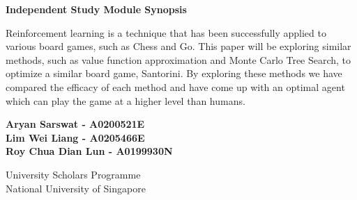 \documentclass[a4paper,12pt,table]{article}
\begin{document}
    
\begin{titlepage}
    \begin{center} 
        \textbf{{\Huge Independent Study Module Synopsis}}
    \vspace{3cm}
    
    \end{center}
  \Large Reinforcement learning is a technique that has been successfully applied to various board games, such as Chess and Go. This paper will be exploring similar methods, such as value function approximation and Monte Carlo Tree Search, to optimize a similar board game, Santorini. By exploring these methods we have compared the efficacy of each method and have come up with an optimal agent which can play the game at a higher level than humans.  \par
 
        \vspace{0.5cm}
 
        \vspace{1.5cm}
 
 
        \vfill
 
 
        \begin{center}
            \textbf{Aryan Sarswat -  A0200521E \\
            Lim Wei Liang - A0205466E \\
            Roy Chua Dian Lun - A0199930N \\ }
    
           \vspace{0.8cm}
    
          University Scholars Programme\\
           National University of Singapore\\
        \end{center}
 \end{titlepage}
\end{document}

